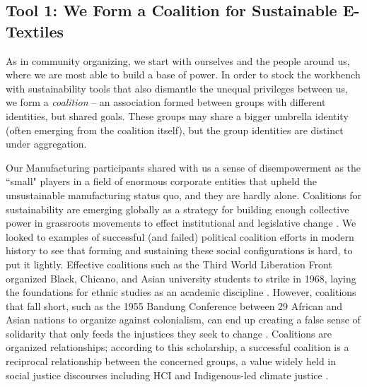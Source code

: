 \subsection{Tool 1: We Form a Coalition for Sustainable E-Textiles}
As in community organizing, we start with ourselves and the people around us, where we are most able to build a base of power.
 In order to stock the workbench with sustainability tools that also dismantle the unequal privileges between us, we form a \textit{coalition} -- 
an association formed between groups with different identities, but shared goals. 
These groups may share a bigger umbrella identity (often emerging from the coalition itself), but the group identities are distinct under aggregation. 

Our Manufacturing participants shared with us a sense of disempowerment as the ``small" players in a field of enormous corporate entities that upheld the unsustainable manufacturing status quo, and they are hardly alone. Coalitions for sustainability are emerging globally as a strategy for building enough collective power in grassroots movements to effect institutional and legislative change \cite{noauthor_movement_nodate, hess_sustainability_2014}. We looked to examples of successful (and failed) political coalition efforts in modern history to see that forming and sustaining these social configurations is hard, to put it lightly. Effective coalitions such as the Third World Liberation Front organized Black, Chicano, and Asian university students to  strike in 1968, laying the foundations for ethnic studies as an academic discipline \cite{npr_student_nodate}. However, coalitions that fall short, such as the 1955 Bandung Conference between 29 African and Asian nations to organize against colonialism, can end up creating a false sense of solidarity that only feeds the injustices they seek to change \cite{nopper_illusion_2015}. Coalitions are organized relationships; according to this scholarship, a successful coalition is a reciprocal relationship between the concerned groups, a value widely held in social justice discourses including HCI \cite{dombrowski_social_2016} and Indigenous-led climate justice \cite{hobart_radical_2020, whyte_indigenous_2017, gomez-barris_extractive_2017}.

